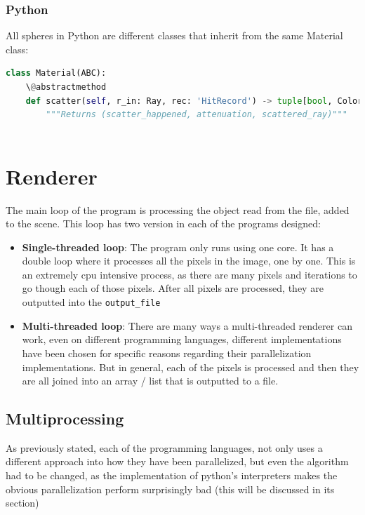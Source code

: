\subsubsection{Python}
All spheres in Python are different classes that inherit from the same Material class:
\begin{lstlisting}[language=Python, caption={Python abscract class.}, label={lst:python_material_abstract}]
class Material(ABC):
    \@abstractmethod
    def scatter(self, r_in: Ray, rec: 'HitRecord') -> tuple[bool, Color, Ray]:
        """Returns (scatter_happened, attenuation, scattered_ray)"""
        
\end{lstlisting}
    


\section{Renderer}
The main loop of the program is processing the object read from the file, added to the scene. 
This loop has two version in each of the programs designed:
\begin{itemize}
    \item \textbf{Single-threaded loop}: The program only runs using one core. It has a double loop where it processes all the pixels in the image, one by one. This is an extremely \gls{cpu} intensive process, as there are many pixels and iterations to go though each of those pixels. After all pixels are processed, they are outputted into the \texttt{output\_file}
    
    \item \textbf{Multi-threaded loop}: There are many ways a multi-threaded renderer can work, even on different programming languages, different implementations have been chosen for specific reasons regarding their parallelization implementations. But in general, each of the pixels is processed and then they are all joined into an array / list that is outputted to a file.
\end{itemize}


\subsection{Multiprocessing}
As previously stated, each of the programming languages, not only uses a different approach into how they have been parallelized, but even the algorithm had to be changed, as the implementation of python's interpreters makes the obvious parallelization perform surprisingly bad (this will be discussed in its section)

